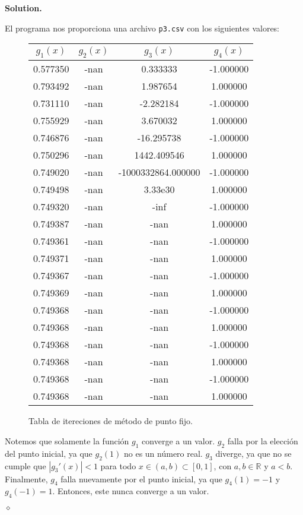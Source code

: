\documentclass{article}
\theoremstyle{problemstyle}
\newenvironment{solution}{%
  \begin{mdframed}[linewidth=0.8pt,linecolor=Gray,backgroundcolor=Gray!5,roundcorner=5pt]%
  \noindent\textbf{Solution.}%
}{%
\hfill $ \diamond $ 
  \end{mdframed}%
}
\newcommand{\R}{\mathbb R}
\begin{document}
\begin{solution}
	
	El programa nos proporciona una archivo \texttt{p3.csv} con los siguientes valores:
	\begin{figure}[H]
		\begin{center}
			\begin{tabular}{c|c|c|c}
				$g_1(x)$ & $g_2(x)$ & $g_3(x)$           & $g_4(x)$  \\ \hline
				0.577350 & -nan     & 0.333333           & -1.000000 \\
				0.793492 & -nan     & 1.987654           & 1.000000  \\
				0.731110 & -nan     & -2.282184          & -1.000000 \\
				0.755929 & -nan     & 3.670032           & 1.000000  \\
				0.746876 & -nan     & -16.295738         & -1.000000 \\
				0.750296 & -nan     & 1442.409546        & 1.000000  \\
				0.749020 & -nan     & -1000332864.000000 & -1.000000 \\
				0.749498 & -nan     & 3.33e30            & 1.000000  \\
				0.749320 & -nan     & -inf               & -1.000000 \\
				0.749387 & -nan     & -nan               & 1.000000  \\
				0.749361 & -nan     & -nan               & -1.000000 \\
				0.749371 & -nan     & -nan               & 1.000000  \\
				0.749367 & -nan     & -nan               & -1.000000 \\
				0.749369 & -nan     & -nan               & 1.000000  \\
				0.749368 & -nan     & -nan               & -1.000000 \\
				0.749368 & -nan     & -nan               & 1.000000  \\
				0.749368 & -nan     & -nan               & -1.000000 \\
				0.749368 & -nan     & -nan               & 1.000000  \\
				0.749368 & -nan     & -nan               & -1.000000 \\
				0.749368 & -nan     & -nan               & 1.000000
			\end{tabular}
		\end{center}
		\caption{Tabla de itereciones de m\'etodo de punto fijo.}\label{fig:root_table}
	\end{figure}
	Notemos que solamente la funci\'on $ g_1 $ converge a un valor. $ g_2 $ falla por la elecci\'on del punto inicial, ya que $ g_2(1) $ no es un n\'umero real. $ g_3 $ diverge, ya que no se cumple que $ |g_3'(x)| < 1 $ para todo $ x\in (a,b)\subset [0,1] $, con $ a,b\in \R $ y $ a<b $. Finalmente, $ g_4 $ falla nuevamente por el punto inicial, ya que $ g_4(1) = -1 $ y $ g_4(-1) = 1 $. Entonces, este nunca converge a un valor.

\end{solution}
\end{document}
